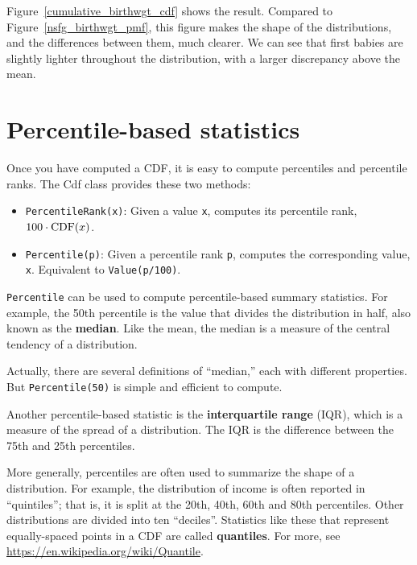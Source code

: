 \documentclass[12pt]{book}
\begin{document}
Figure~\ref{cumulative_birthwgt_cdf} shows the result.
Compared to Figure~\ref{nsfg_birthwgt_pmf},
this figure makes the shape of the distributions, and the differences
between them, much clearer.  We can see that first babies are slightly
lighter throughout the distribution, with a larger discrepancy above 
the mean.




\section{Percentile-based statistics}

Once you have computed a CDF, it is easy to compute percentiles
and percentile ranks.  The Cdf class provides these two methods:

\begin{itemize}

\item \verb"PercentileRank(x)": Given a value \verb"x", computes its
percentile rank, $100 \cdot \mathrm{CDF}(x)$.

\item \verb"Percentile(p)": Given a percentile rank \verb"p",
computes the corresponding value, \verb"x".  Equivalent to
\verb"Value(p/100)".

\end{itemize}

\verb"Percentile" can be used to compute percentile-based summary
statistics.  For example, the 50th percentile is the value that
divides the distribution in half, also known as the {\bf median}.
Like the mean, the median is a measure of the central tendency
of a distribution.

Actually, there are several definitions of ``median,'' each with
different properties.  But \verb"Percentile(50)" is simple and
efficient to compute.

Another percentile-based statistic is the {\bf interquartile range} (IQR),
which is a measure of the spread of a distribution.  The IQR
is the difference between the 75th and 25th percentiles.

More generally, percentiles are often used to summarize the shape
of a distribution.  For example, the distribution of income is
often reported in ``quintiles''; that is, it is split at the
20th, 40th, 60th and 80th percentiles.  Other distributions
are divided into ten ``deciles''.  Statistics like these that represent
equally-spaced points in a CDF are called {\bf quantiles}.
For more, see \url{https://en.wikipedia.org/wiki/Quantile}.
\end{document}
